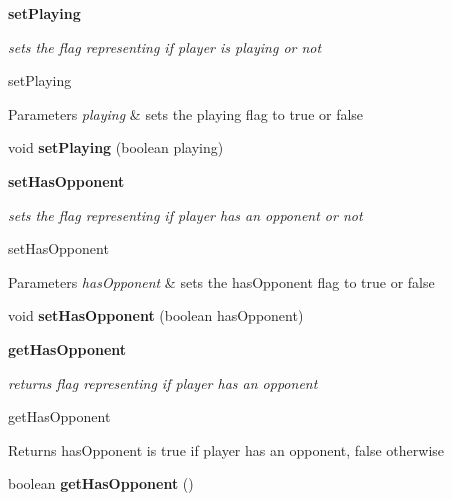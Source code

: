 \begin{Indent}{\bf set\+Playing}\par
{\em sets the flag representing if player is playing or not

set\+Playing


\begin{DoxyParams}{Parameters}
{\em playing} & sets the playing flag to true or false \\
\hline
\end{DoxyParams}
}\begin{DoxyCompactItemize}
\item 
\hypertarget{classbattleship_1_1network_1_1PlayerProxy_aa30d62bf84ca508f0cb9a1db6e4bd9f2}{}void {\bfseries set\+Playing} (boolean playing)\label{classbattleship_1_1network_1_1PlayerProxy_aa30d62bf84ca508f0cb9a1db6e4bd9f2}

\end{DoxyCompactItemize}
\end{Indent}
\begin{Indent}{\bf set\+Has\+Opponent}\par
{\em sets the flag representing if player has an opponent or not

set\+Has\+Opponent


\begin{DoxyParams}{Parameters}
{\em has\+Opponent} & sets the has\+Opponent flag to true or false \\
\hline
\end{DoxyParams}
}\begin{DoxyCompactItemize}
\item 
\hypertarget{classbattleship_1_1network_1_1PlayerProxy_a274f820c15c434ae54f723b6bd8c0c52}{}void {\bfseries set\+Has\+Opponent} (boolean has\+Opponent)\label{classbattleship_1_1network_1_1PlayerProxy_a274f820c15c434ae54f723b6bd8c0c52}

\end{DoxyCompactItemize}
\end{Indent}
\begin{Indent}{\bf get\+Has\+Opponent}\par
{\em returns flag representing if player has an opponent

get\+Has\+Opponent

\begin{DoxyReturn}{Returns}
has\+Opponent is true if player has an opponent, false otherwise 
\end{DoxyReturn}
}\begin{DoxyCompactItemize}
\item 
\hypertarget{classbattleship_1_1network_1_1PlayerProxy_ad31c2bffc7850189530630ca25782440}{}boolean {\bfseries get\+Has\+Opponent} ()\label{classbattleship_1_1network_1_1PlayerProxy_ad31c2bffc7850189530630ca25782440}

\end{DoxyCompactItemize}
\end{Indent}
